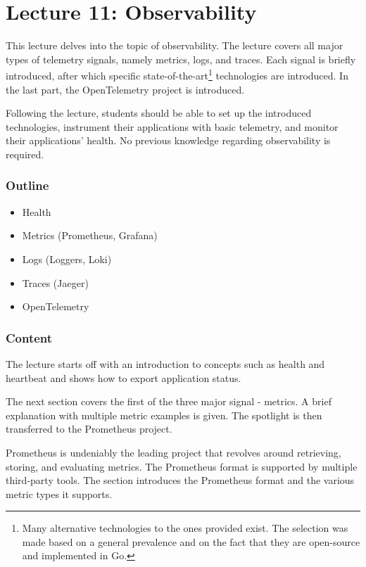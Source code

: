 \documentclass[
  digital,
  color,
  oneside,
  nosansbold,
  nocolorbold,
  nolof,
  nolot,
]{fithesis4}
\begin{document}
\section{Lecture 11: Observability}\label{lecture-observability}

This lecture delves into the topic of observability. The lecture covers all major types of telemetry signals, namely metrics, logs, and traces. Each signal is briefly introduced, after which specific state-of-the-art\footnote{Many alternative technologies to the ones provided exist. The selection was made based on a general prevalence and on the fact that they are open-source and implemented in Go.}
technologies are introduced. In the last part, the OpenTelemetry\cite{open-telemetry} project is introduced.

Following the lecture, students should be able to set up the introduced technologies, instrument their applications with basic telemetry, and monitor their applications' health. No previous knowledge regarding observability is required.

\subsubsection{Outline}

\begin{itemize}
    \item Health
    \item Metrics (Prometheus, Grafana)
    \item Logs (Loggers, Loki)
    \item Traces (Jaeger)
    \item OpenTelemetry
\end{itemize}

\subsubsection{Content}

The lecture starts off with an introduction to concepts such as health and heartbeat and shows how to export application status.

The next section covers the first of the three major signal - metrics. A brief explanation with multiple metric examples is given. The spotlight is then transferred to the Prometheus project.

Prometheus\cite{prometheus} is undeniably the leading project that revolves around retrieving, storing, and evaluating metrics. The Prometheus format is supported by multiple third-party tools. The section introduces the Prometheus format and the various metric types it supports.
\end{document}
